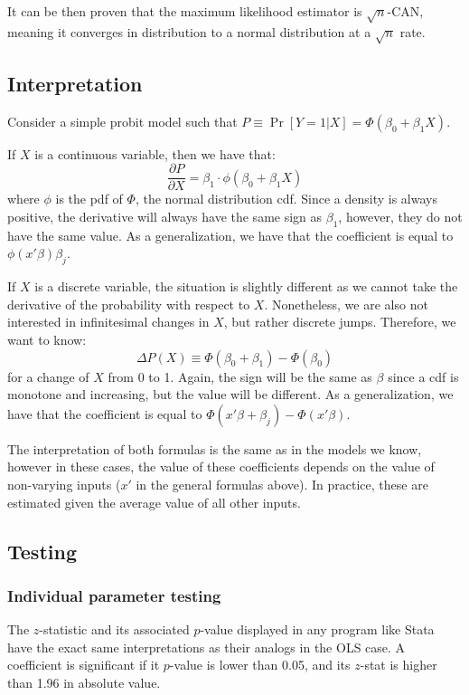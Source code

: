 \documentclass[12pt]{report}
\newcommand{\Prob}[1]{\operatorname{Pr}\left[#1\right]}
\begin{document}
It can be then proven that the maximum likelihood estimator is $\sqrt{n}$-CAN, meaning it converges in distribution to a normal distribution at a $\sqrt{n}$ rate.

\subsection{Interpretation}

Consider a simple probit model such that $P\equiv \Prob{Y =1\vert X} = \Phi(\beta_0 + \beta_1X)$. 

If $X$ is a continuous variable, then we have that: $$\frac{\partial P}{\partial X} = \beta_1\cdot \phi(\beta_0 + \beta_1X) $$ where $\phi$ is the pdf of $\Phi$, the normal distribution cdf. Since a density is always positive, the derivative will always have the same sign as $\beta_1$, however, they do not have the same value. As a generalization, we have that the coefficient is equal to $\phi(x'\beta)\beta_j$.

If $X$ is a discrete variable, the situation is slightly different as we cannot take the derivative of the probability with respect to $X$. Nonetheless, we are also not interested in infinitesimal changes in $X$, but rather discrete jumps. Therefore, we want to know: $$\Delta P(X) \equiv \Phi(\beta_0 + \beta_1) -  \Phi(\beta_0)$$ for a change of $X$ from 0 to 1. Again, the sign will be the same as $\beta$ since a cdf is monotone and increasing, but the value will be different. As a generalization, we have that the coefficient is equal to $\Phi(x'\beta + \beta_j) - \Phi(x'\beta)$.

The interpretation of both formulas is the same as in the models we know, however in these cases, the value of these coefficients depends on the value of non-varying inputs ($x'$ in the general formulas above). In practice, these are estimated given the average value of all other inputs.

\subsection{Testing}

\subsubsection{Individual parameter testing}

The $z$-statistic and its associated $p$-value displayed in any program like Stata have the exact same interpretations as their analogs in the OLS case. A coefficient is significant if it $p$-value is lower than 0.05, and its $z$-stat is higher than 1.96 in absolute value.
\end{document}
